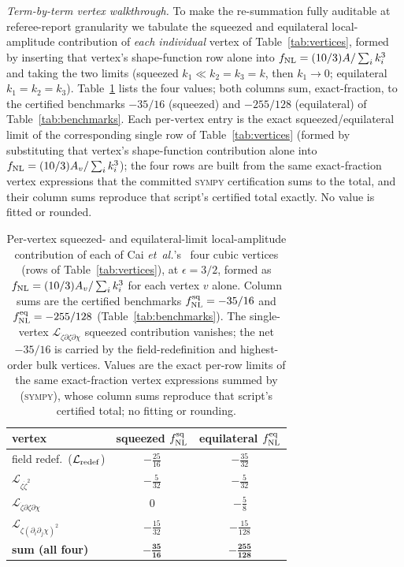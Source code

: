 \documentclass[aps,prd,twocolumn,superscriptaddress,showpacs,preprintnumbers,nofootinbib,longbibliography,floatfix]{revtex4-2}
\newcommand{\fnl}{f_{\rm NL}}
\newcommand{\etal}{\textit{et~al.}}
\begin{document}
\emph{Term-by-term vertex walkthrough.} To make the re-summation fully auditable at referee-report granularity we tabulate the squeezed and equilateral local-amplitude contribution of \emph{each individual} vertex of Table~\ref{tab:vertices}, formed by inserting that vertex's shape-function row alone into $\fnl=(10/3)A/\sum_i k_i^3$ and taking the two limits (squeezed $k_1\ll k_2=k_3=k$, then $k_1\to0$; equilateral $k_1=k_2=k_3$). Table~\ref{tab:vertexwalk} lists the four values; both columns sum, exact-fraction, to the certified benchmarks $-35/16$ (squeezed) and $-255/128$ (equilateral) of Table~\ref{tab:benchmarks}. Each per-vertex entry is the exact squeezed/equilateral limit of the corresponding single row of Table~\ref{tab:vertices} (formed by substituting that vertex's shape-function contribution alone into $\fnl=(10/3)A_v/\sum_i k_i^3$); the four rows are built from the same exact-fraction vertex expressions that the committed \textsc{sympy} certification  sums to the total, and their column sums reproduce that script's certified total exactly. No value is fitted or rounded.
\begin{table}[t]
\centering
\caption{\label{tab:vertexwalk}Per-vertex squeezed- and equilateral-limit local-amplitude contribution of each of Cai \etal's~\cite{Cai:2009fn} four cubic vertices (rows of Table~\ref{tab:vertices}), at $\epsilon=3/2$, formed as $\fnl=(10/3)A_v/\sum_i k_i^3$ for each vertex $v$ alone. Column sums are the certified benchmarks $\fnl^{\rm sq}=-35/16$ and $\fnl^{\rm eq}=-255/128$ (Table~\ref{tab:benchmarks}). The single-vertex $\mathcal{L}_{\dot\zeta\partial\zeta\partial\chi}$ squeezed contribution vanishes; the net $-35/16$ is carried by the field-redefinition and highest-order bulk vertices. Values are the exact per-row limits of the same exact-fraction vertex expressions summed by \protect{} (\textsc{sympy}), whose column sums reproduce that script's certified total; no fitting or rounding.}
\begin{ruledtabular}
\begin{tabular}{lcc}
vertex & squeezed $\fnl^{\rm sq}$ & equilateral $\fnl^{\rm eq}$ \\ \hline
field redef.\ ($\mathcal{L}_{\rm redef}$) & $-\tfrac{25}{16}$ & $-\tfrac{35}{32}$ \\
$\mathcal{L}_{\zeta\dot\zeta^2}$ & $-\tfrac{5}{32}$ & $-\tfrac{5}{32}$ \\
$\mathcal{L}_{\dot\zeta\partial\zeta\partial\chi}$ & $0$ & $-\tfrac{5}{8}$ \\
$\mathcal{L}_{\zeta(\partial_i\partial_j\chi)^2}$ & $-\tfrac{15}{32}$ & $-\tfrac{15}{128}$ \\ \hline
\textbf{sum (all four)} & $\mathbf{-\tfrac{35}{16}}$ & $\mathbf{-\tfrac{255}{128}}$ \\
\end{tabular}
\end{ruledtabular}
\end{table}
\end{document}
